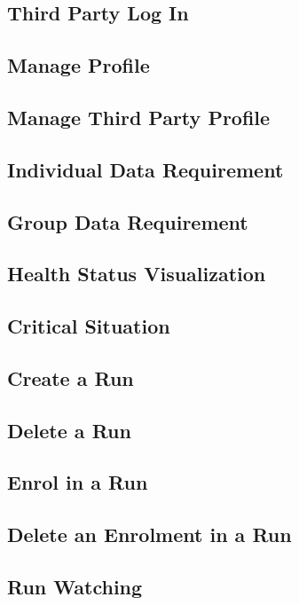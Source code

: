 \subsection{Third Party Log In}

\clearpage

\subsection{Manage Profile}

\clearpage

\subsection{Manage Third Party Profile}

\clearpage

\subsection{Individual Data Requirement}

\clearpage

\subsection{Group Data Requirement}

\clearpage

\subsection{Health Status Visualization}

\clearpage

\subsection{Critical Situation}

\clearpage

\subsection{Create a Run}

\clearpage

\subsection{Delete a Run}

\clearpage

\subsection{Enrol in a Run}

\clearpage

\subsection{Delete an Enrolment in a Run}

\clearpage

\subsection{Run Watching}

\clearpage
